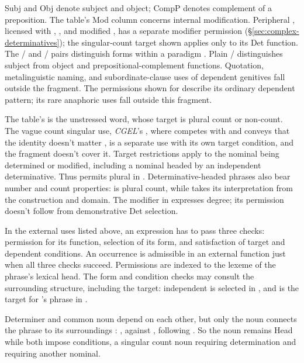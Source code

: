 \documentclass[12pt]{article}
\begin{document}
Subj and Obj denote subject and object; CompP denotes complement of a preposition. The table's Mod column concerns internal modification. Peripheral , licensed with , , and modified , has a separate modifier permission (§\ref{sec:complex-determinatives}); the singular-count target shown applies only to its Det function. The / and / pairs distinguish forms within a paradigm \citep[389--390, 470--471]{huddleston2002}. Plain / distinguishes subject from object and prepositional-complement functions. Quotation, metalinguistic naming, and subordinate-clause uses of dependent genitives fall outside the fragment. The permissions shown for  describe its ordinary dependent pattern; its rare anaphoric uses fall outside this fragment.

The table's  is the unstressed word, whose target is plural count or non-count. The vague count singular use, \textit{CGEL}'s , where  competes with  and conveys that the identity doesn't matter \citep[380]{huddleston2002}, is a separate use with its own target condition, and the fragment doesn't cover it. Target restrictions apply to the nominal being determined or modified, including a nominal headed by an independent determinative. Thus  permits plural  in . Determinative-headed phrases also bear number and count properties:  is plural count, while  takes its interpretation from the construction and domain. The modifier  in  expresses degree; its permission doesn't follow from demonstrative Det selection.

In the external uses listed above, an expression has to pass three checks: permission for its function, selection of its form, and satisfaction of target and dependent conditions. An occurrence is admissible in an external function just when all three checks succeed. Permissions are indexed to the lexeme of the phrase's lexical head. The form and condition checks may consult the surrounding structure, including the target: independent  is selected in , and  is the target for 's phrase in .

Determiner and common noun depend on each other, but only the noun connects the phrase to its surroundings \citep[7--8]{hudson2004determiners}: , against  \citep[10--12]{hudson2004determiners}, following \textcite{vanlangendonck1994}. So the noun remains Head while both impose conditions, a singular count noun requiring determination and  requiring another nominal.
\end{document}
